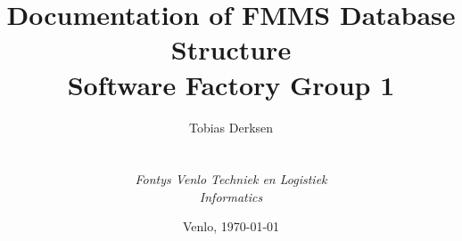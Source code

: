 
\def\Company{\textit{FSG1 - Fontys SoFa Group 1}}
\def\Institute{\textit{Fontys Venlo Techniek en Logistiek}}
\def\Course{\textit{Informatics}}

\def\BoldTitle{Documentation of FMMS Database Structure}
\def\Subtitle{Software Factory Group 1}
\def\Authors{Tobias Derksen}


\title{\textbf{\BoldTitle}\\\Subtitle}
\author{\Authors \\ \\ \\ \Institute\\ \Course}
\date{Venlo, \today}

